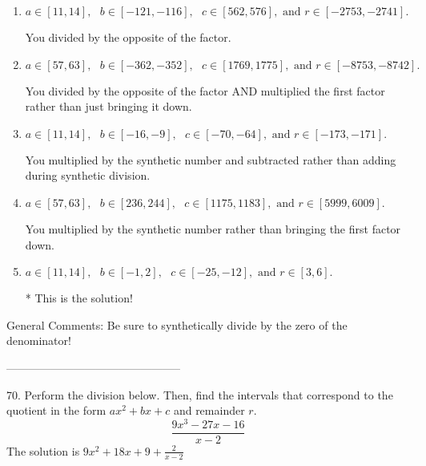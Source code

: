 \documentclass{extbook}[14pt]
\begin{document}
\begin{enumerate}[label=\Alph*.] 
\item $ a \in [11, 14], \text{   } b \in [-121, -116], \text{   } c \in [562, 576], \text{   and   } r \in [-2753, -2741]. $ 

  You divided by the opposite of the factor. 
\item $ a \in [57, 63], \text{   } b \in [-362, -352], \text{   } c \in [1769, 1775], \text{   and   } r \in [-8753, -8742]. $ 

  You divided by the opposite of the factor AND multiplied the first factor rather than just bringing it down. 
\item $ a \in [11, 14], \text{   } b \in [-16, -9], \text{   } c \in [-70, -64], \text{   and   } r \in [-173, -171]. $ 

  You multiplied by the synthetic number and subtracted rather than adding during synthetic division. 
\item $ a \in [57, 63], \text{   } b \in [236, 244], \text{   } c \in [1175, 1183], \text{   and   } r \in [5999, 6009]. $ 

  You multiplied by the synthetic number rather than bringing the first factor down. 
\item $ a \in [11, 14], \text{   } b \in [-1, 2], \text{   } c \in [-25, -12], \text{   and   } r \in [3, 6]. $ 

 * This is the solution! 
\end{enumerate} 
 
General Comments: Be sure to synthetically divide by the zero of the denominator!

-----------------------------------------------

70. Perform the division below. Then, find the intervals that correspond to the quotient in the form $ax^2+bx+c$ and remainder $r$.
\[ \frac{9x^{3} -27 x -16}{x -2} \] 
The solution is $ 9x^{2} +18 x + 9 + \frac{2}{x -2} $ 
\end{document}
